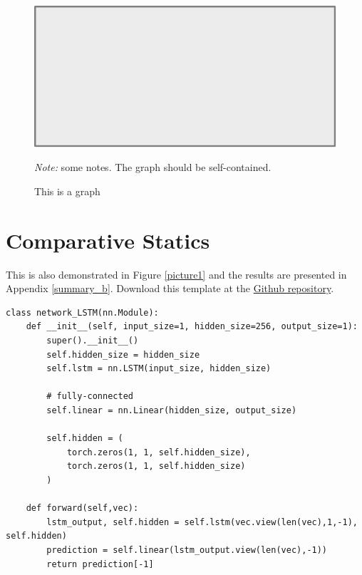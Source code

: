 \documentclass[11pt, letterpaper]{article}
\begin{document}
\begin{figure}[H]
  \centering
  \caption{This is a graph}
  \includegraphics[scale=0.5]{Graph/pic.pdf}
  \hspace*{-0.6cm}
  \begin{minipage}{0.9\textwidth}
    \onehalfspacing
    \vspace*{0.12cm}
    \begin{tablenotes}
      \footnotesize
      \item\textit{Note:} some notes. The graph should be self-contained. \lipsum[65]
    \end{tablenotes}
  \end{minipage}
\end{figure}

\section{Comparative Statics}

This is also demonstrated in Figure \ref{picture1} and the results are presented in Appendix \ref{summary_b}. Download this template at the \href{https://github.com/howardhsumail/Paper-LaTeX-Template.git}{Github repository}.

\begin{lstlisting}[style=python_code, caption={Long short-term memory}, label=mypythoncode]
class network_LSTM(nn.Module):
    def __init__(self, input_size=1, hidden_size=256, output_size=1):
        super().__init__()
        self.hidden_size = hidden_size
        self.lstm = nn.LSTM(input_size, hidden_size)

        # fully-connected
        self.linear = nn.Linear(hidden_size, output_size)

        self.hidden = (
            torch.zeros(1, 1, self.hidden_size),
            torch.zeros(1, 1, self.hidden_size)
        )

    def forward(self,vec):
        lstm_output, self.hidden = self.lstm(vec.view(len(vec),1,-1), self.hidden)
        prediction = self.linear(lstm_output.view(len(vec),-1))
        return prediction[-1]
\end{lstlisting}
\end{document}
